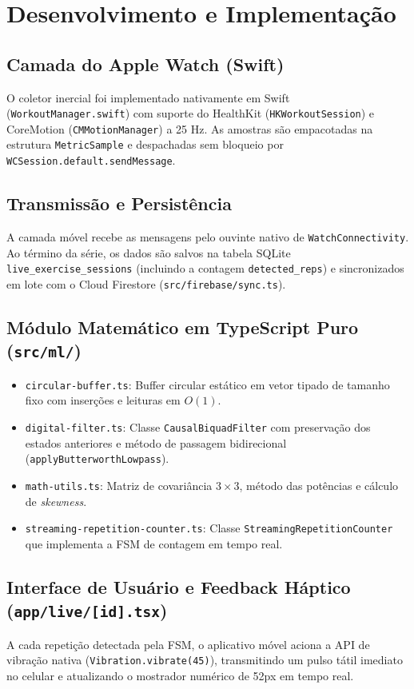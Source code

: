 \documentclass[12pt,openany,oneside,a4paper,english,brazil]{abntex2}
\begin{document}
\chapter{Desenvolvimento e Implementação}

\section{Camada do Apple Watch (Swift)}
O coletor inercial foi implementado nativamente em Swift (\texttt{WorkoutManager.swift}) com suporte do HealthKit (\texttt{HKWorkoutSession}) e CoreMotion (\texttt{CMMotionManager}) a 25 Hz. As amostras são empacotadas na estrutura \texttt{MetricSample} e despachadas sem bloqueio por \texttt{WCSession.default.sendMessage}.

\section{Transmissão e Persistência}
A camada móvel recebe as mensagens pelo ouvinte nativo de \texttt{WatchConnectivity}. Ao término da série, os dados são salvos na tabela SQLite \texttt{live\_exercise\_sessions} (incluindo a contagem \texttt{detected\_reps}) e sincronizados em lote com o Cloud Firestore (\texttt{src/firebase/sync.ts}).

\section{Módulo Matemático em TypeScript Puro (\texttt{src/ml/})}
\begin{itemize}
    \item \texttt{circular-buffer.ts}: Buffer circular estático em vetor tipado de tamanho fixo com inserções e leituras em $O(1)$.
    \item \texttt{digital-filter.ts}: Classe \texttt{CausalBiquadFilter} com preservação dos estados anteriores e método de passagem bidirecional (\texttt{applyButterworthLowpass}).
    \item \texttt{math-utils.ts}: Matriz de covariância $3 \times 3$, método das potências e cálculo de \textit{skewness}.
    \item \texttt{streaming-repetition-counter.ts}: Classe \texttt{StreamingRepetitionCounter} que implementa a FSM de contagem em tempo real.
\end{itemize}

\section{Interface de Usuário e Feedback Háptico (\texttt{app/live/[id].tsx})}
A cada repetição detectada pela FSM, o aplicativo móvel aciona a API de vibração nativa (\texttt{Vibration.vibrate(45)}), transmitindo um pulso tátil imediato no celular e atualizando o mostrador numérico de 52px em tempo real.
\end{document}
